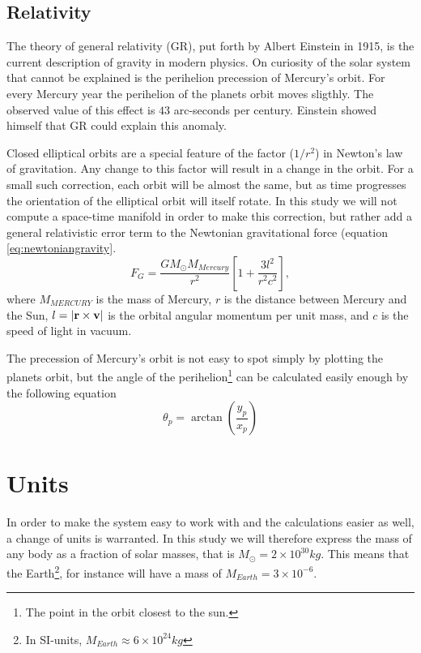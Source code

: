 \documentclass[10pt,a4paper]{amsart}
\begin{document}
\subsection{Relativity}

The theory of general relativity (GR), put forth by Albert Einstein in 1915, is the current description of gravity in modern physics. On curiosity of the solar system that cannot be explained is the perihelion precession of Mercury's orbit. For every Mercury year the perihelion of the planets orbit moves sligthly. The observed value of this effect is $43$ arc-seconds per century. Einstein showed himself that GR could explain this anomaly.

Closed elliptical orbits are a special feature of the factor ($1/r^2$) in Newton's law of gravitation. Any change to this factor will result in a change in the orbit. For a small such correction, each orbit will be almost the same, but as time progresses the orientation of the elliptical orbit will itself rotate. In this study we will not compute a space-time manifold in order to make this correction, but rather add a general relativistic error term to the Newtonian gravitational force (equation \ref{eq:newtoniangravity}.
\begin{equation}
\label{eq:relativenewton}
F_G = \frac{GM_{\odot}M_{Mercury}}{r^2}\left[1+\frac{3l^2}{r^2c^2} \right],
\end{equation}
where $M_{MERCURY}$ is the mass of Mercury, $r$ is the distance between Mercury and the Sun, $l=\abs{\vb{r}\times\vb{v}}$ is the orbital angular momentum per unit mass, and $c$ is the speed of light in vacuum.

The precession of Mercury's orbit is not easy to spot simply by plotting the planets orbit, but the angle of the perihelion\footnote{The point in the orbit closest to the sun.} can be calculated easily enough by the following equation
\begin{equation}
\label{eq:perangle}
\theta_p = \arctan \left( \frac{y_p}{x_p}\right)
\end{equation}

\section{Units}
In order to make the system easy to work with and the calculations easier as well, a change of units is warranted. In this study we will therefore express the mass of any body as a fraction of solar masses, that is $M_{\odot} = 2\times10^{30}kg$. This means that the Earth\footnote{In SI-units, $M_{Earth}\approx6\times10^{24}kg$}, for instance will have a mass of $M_{Earth}= 3\times10^{-6}$.
\end{document}
